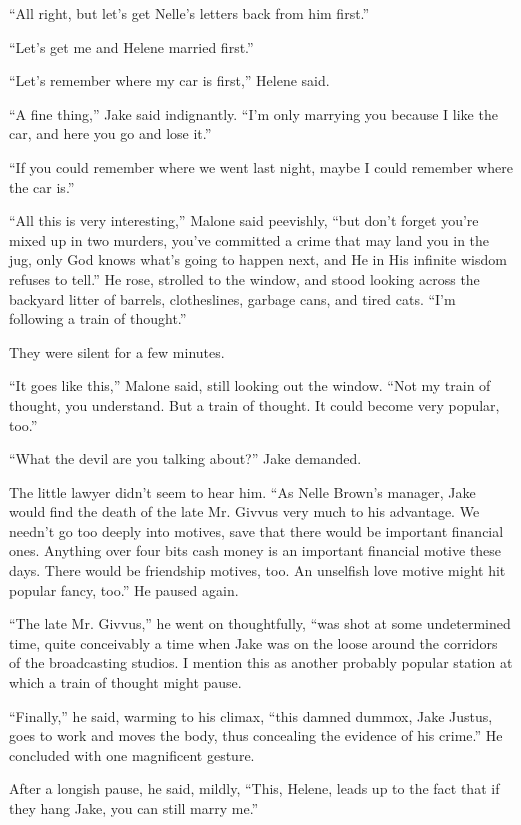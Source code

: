 \documentclass{novel}
\begin{document}
“All right, but let’s get Nelle’s letters back from him first.”

“Let’s get me and Helene married first.”

“Let’s remember where my car is first,” Helene said.

“A fine thing,” Jake said indignantly. “I’m only marrying you because I like the car, and here you go and lose it.”

“If you could remember where we went last night, maybe I could remember where the car is.”

“All this is very interesting,” Malone said peevishly, “but don’t forget you’re mixed up in two murders, you’ve committed a crime that may land you in the jug, only God knows what’s going to happen next, and He in His infinite wisdom refuses to tell.” He rose, strolled to the window, and stood looking across the backyard litter of barrels, clotheslines, garbage cans, and tired cats. “I’m following a train of thought.”

They were silent for a few minutes.

“It goes like this,” Malone said, still looking out the window. “Not my train of thought, you understand. But a train of thought. It could become very popular, too.”

“What the devil are you talking about?” Jake demanded.

The little lawyer didn’t seem to hear him. “As Nelle Brown’s manager, Jake would find the death of the late Mr. Givvus very much to his advantage. We needn’t go too deeply into motives, save that there would be important financial ones. Anything over four bits cash money is an important financial motive these days. There would be friendship motives, too. An unselfish love motive might hit popular fancy, too.” He paused again.

“The late Mr. Givvus,” he went on thoughtfully, “was shot at some undetermined time, quite conceivably a time when Jake was on the loose around the corridors of the broadcasting studios. I mention this as another probably popular station at which a train of thought might pause.

“Finally,” he said, warming to his climax, “this damned dummox, Jake Justus, goes to work and moves the body, thus concealing the evidence of his crime.” He concluded with one magnificent gesture.

After a longish pause, he said, mildly, “This, Helene, leads up to the fact that if they hang Jake, you can still marry me.”
\end{document}
